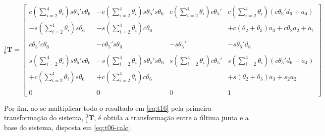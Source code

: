 \begin{equation}
    \label{eq:t16}
    ^1_6\textbf{T} = \begin{bmatrix}
        c(\sum\limits_{i=2}^4\theta_i)s\theta_5'c\theta_6 & -c(\sum\limits_{i=2}^4\theta_i)s\theta_5's\theta_6 & c(\sum\limits_{i=2}^4\theta_i)c\theta_5' & c(\sum\limits_{i=2}^4\theta_i)(c\theta_5'd_6 + a_4) \\
        -s(\sum\limits_{i=2}^4\theta_i)s\theta_6          & -s(\sum\limits_{i=2}^4\theta_i)c\theta_6           &                                         & +c(\theta_2+\theta_3)a_3 + c\theta_2a_2 + a_1\\
        \\
        c\theta_5'c\theta_6                              & -c\theta_5's\theta_6                              & -s\theta_5'                             & -s\theta_5'd_6 \\
        \\
        s(\sum\limits_{i=2}^4\theta_i)s\theta_5'c\theta_6 & -s(\sum\limits_{i=2}^4\theta_i)s\theta_5's\theta_6 & s(\sum\limits_{i=2}^4\theta_i)c\theta_5' & s(\sum\limits_{i=2}^4\theta_i)(c\theta_5'd_6 + a_4) \\
        +c(\sum\limits_{i=2}^4\theta_i)s\theta_6          & +c(\sum\limits_{i=2}^4\theta_i)c\theta_6           &                                         & +s(\theta_2+\theta_3)a_3 + s_2a_2 \\
        \\
        0 & 0 & 0 & 1
    \end{bmatrix}
\end{equation}

Por fim, ao se multiplicar todo o resultado em \ref{eq:t16} pela primeira transformação do sistema, $^0_1\textbf{T}$, é obtida a transformação 
entre a última junta e a base do sistema, disposta em \ref{eq:t06-calc}.

